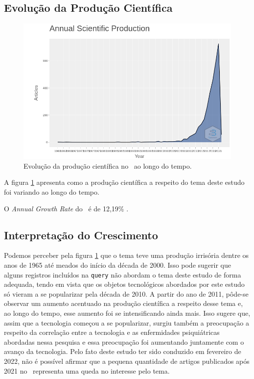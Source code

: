 \subsection{Evolução da Produção Científica}

\begin{figure}
    \centering
    \includegraphics[width=1\textwidth]{experiments/GustavoMacCar/AnaliseBibliometrica/PsychDiseasesTech/anual-scientific-production.png}
    \caption{Evolução da produção científica no \dataset\ ao longo do tempo.}
    \label{fig:evol:anual:psych}
\end{figure}

A figura \ref{fig:evol:anual:psych} apresenta como a produção científica a respeito do tema deste estudo foi variando ao longo do tempo.

O \textit{Annual Growth Rate} do \dataset\   é de 12,19\% .

\subsection{Interpretação do Crescimento} Podemos perceber pela figura \ref{fig:evol:anual:psych} que o tema teve uma produção irrisória dentre os anos de 1965 até meados do início da década de 2000. Isso pode sugerir
que alguns registros incluídos na \texttt{query} não abordam o tema deste estudo de forma adequada, tendo em vista que os objetos tecnológicos abordados por este estudo só vieram a se popularizar pela década de 2010. A partir do
ano de 2011, pôde-se observar um aumento acentuado na produção científica a respeito desse tema e, ao longo do tempo, esse aumento foi se intensificando ainda mais. Isso sugere que, assim que a tecnologia começou a se popularizar, surgiu também
a preocupação a respeito da correlação entre a tecnologia e as enfermidades psiquiátricas abordadas nessa pesquisa e essa preocupação foi aumentando juntamente com o avanço da tecnologia. Pelo fato deste estudo ter sido conduzido em fevereiro de 2022,
não é possível afirmar que a pequena quantidade de artigos publicados após 2021 no \dataset\ representa uma queda no interesse pelo tema.
